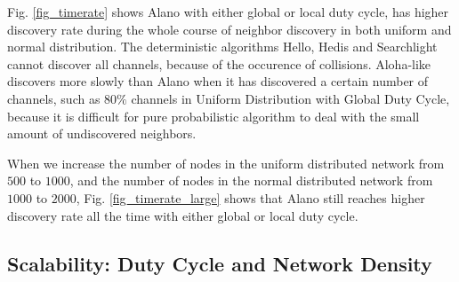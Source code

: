 Fig. \ref{fig_timerate} shows Alano with either global or local duty cycle, has higher discovery rate during the whole course of neighbor discovery in both uniform and normal distribution. The deterministic algorithms Hello, Hedis and Searchlight cannot discover all channels, because of the occurence of collisions. Aloha-like discovers more slowly than Alano when it has discovered a certain number of channels, such as $80\%$ channels in Uniform Distribution with Global Duty Cycle, because it is difficult for pure probabilistic algorithm to deal with the small amount of   undiscovered neighbors.




When we increase the number of nodes in the uniform distributed  network from $500$ to $1000$, and the number of nodes in the normal distributed network from $1000$ to $2000$, Fig. \ref{fig_timerate_large} shows that Alano still reaches higher discovery rate all the time with either global or local duty cycle.








\subsection{Scalability: Duty Cycle and Network Density}

